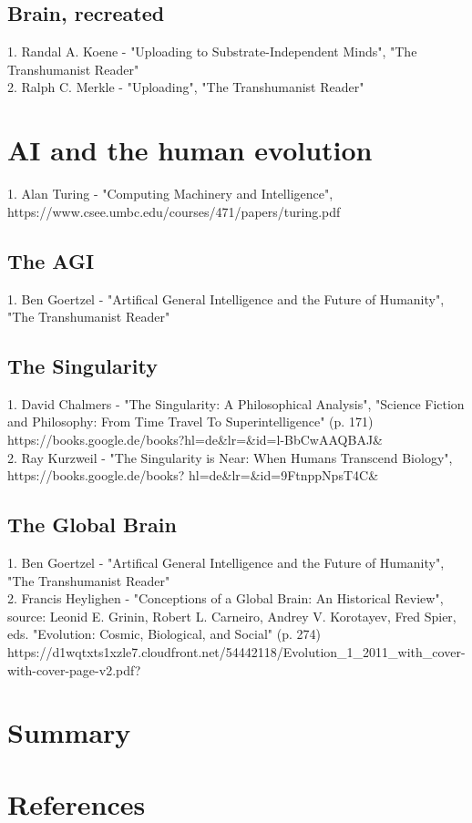 \documentclass[10pt]{article}
\begin{document}
\subsection{Brain, recreated}
	1. Randal A. Koene - "Uploading to Substrate-Independent Minds", "The Transhumanist Reader"\\	
	2. Ralph C. Merkle - "Uploading", "The Transhumanist Reader"
	
\section{AI and the human evolution}
	1. Alan Turing - "Computing Machinery and Intelligence", https://www.csee.umbc.edu/courses/471/papers/turing.pdf 
\subsection{The AGI}
	1. Ben Goertzel - "Artifical General Intelligence and the Future of Humanity", "The Transhumanist Reader"\\
\subsection{The Singularity}
	1. David Chalmers - "The Singularity: A Philosophical Analysis", "Science Fiction and Philosophy: From Time Travel To Superintelligence" (p. 171) https://books.google.de/books?hl=de\&lr=\&id=l-BbCwAAQBAJ\&\\
	2. Ray Kurzweil - "The Singularity is Near: When Humans Transcend Biology", https://books.google.de/books? hl=de\&lr=\&id=9FtnppNpsT4C\&
\subsection{The Global Brain}
	1. Ben Goertzel - "Artifical General Intelligence and the Future of Humanity", "The Transhumanist Reader"\\
	2. Francis Heylighen - "Conceptions of a Global Brain: An Historical Review", source: Leonid E. Grinin, Robert L. Carneiro, Andrey V. Korotayev, Fred Spier, eds. "Evolution: Cosmic, Biological, and Social" (p. 274) https://d1wqtxts1xzle7.cloudfront.net/54442118/Evolution\_1\_2011\_with\_cover-with-cover-page-v2.pdf?
\section{Summary}



\section{References}
\end{document}

